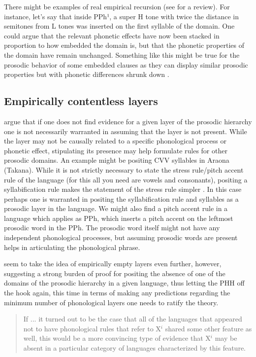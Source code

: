\documentclass[output=paper,hidelinks]{langscibook}
\begin{document}
There might be examples of real empirical recursion (see \cite{fery2017intonation} for a review). For instance, let's say that inside PPh¹, a super H tone with twice the distance in semitones from L tones was inserted on the first syllable of the domain. One could argue that the relevant phonetic effects have now been stacked in proportion to how embedded the domain is, but that the phonetic properties of the domain have remain unchanged. Something like this might be true for the prosodic behavior of some embedded clauses as they can display similar prosodic properties but with phonetic differences shrunk down \citep{vigario2010prosodic}.

\subsection{Empirically contentless layers}
\label{sec:empiricallycontentlesslayers}

\citet[11]{nespor2007prosodic} argue that if one does not find evidence for a given layer of the prosodic hierarchy one is not necessarily warranted in assuming that the layer is not present. While the layer may not be causally related to a specific phonological process or phonetic effect, stipulating its presence may help formulate rules for other prosodic domains. An example might be positing CVV syllables in Araona (Takana). While it is not strictly necessary to state the stress rule/pitch accent rule of the language (for this all you need are vowels and consonants), positing a syllabification rule makes the statement of the stress rule simpler \citep{tallmanacceptedprefix}. In this case perhaps one is warranted in positing the syllabification rule and syllables as a prosodic layer in the language. We might also find a pitch accent rule in a language which applies as PPh, which inserts a pitch accent on the leftmost prosodic word in the PPh. The prosodic word itself might not have any independent phonological processes, but assuming prosodic words are present helps in articulating the phonological phrase.

\citet[11-12]{nespor2007prosodic} seem to take the idea of empirically empty layers even further, however, suggesting a strong burden of proof for positing the absence of one of the domains of the prosodic hierarchy in a given language, thus letting the PHH off the hook again, this time in terms of making any predictions regarding the minimum number of phonological layers one needs to ratify the theory.

\begin{quote}
    If ... it turned out to be the case that all of the languages that appeared not to have phonological rules that refer to X$^i$ shared some other feature as well, this would be a more convincing type of evidence that X$^i$ may be absent in a particular category of languages characterized by this feature.
\end{quote}
\end{document}
